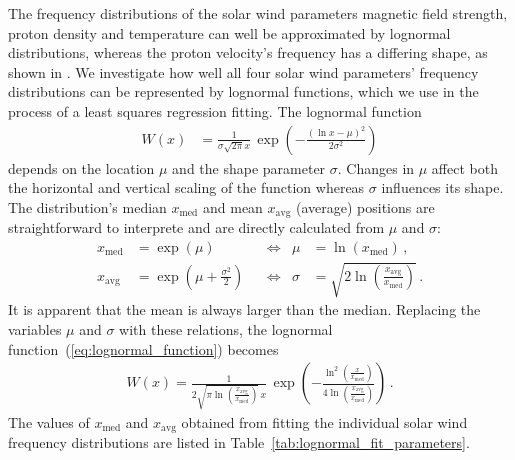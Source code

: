 The frequency distributions of the solar wind parameters magnetic field strength, proton density and temperature can
well be approximated by lognormal distributions, whereas the proton velocity’s frequency has a differing shape, as shown in \citet{Veselovsky2010}. We investigate how well all four solar wind parameters’ frequency distributions can be represented by lognormal functions, which we use in the process of a least squares regression fitting. The lognormal function 
\begin{align}
	W(x) &= \frac{1}{\sigma \sqrt{2 \pi} x} \, \exp\left(- \frac{\left(\ln x - \mu\right)^2}{2 \sigma^2}\right)	\label{eq:lognormal_function}
\end{align}
depends on the location $\mu$ and the shape parameter $\sigma$. Changes in $\mu$ affect both the horizontal and vertical scaling of the function whereas $\sigma$ influences its shape. The distribution's median $x_\text{med}$ and mean $x_\text{avg}$ (average) positions are straightforward to interprete and are directly calculated from $\mu$ and $\sigma$:
\begin{align}
	x_\text{med} &= \exp\left(\mu\right)	&	&\Longleftrightarrow	&	\mu &= \ln\left(x_\text{med}\right)\,,	\label{eq:lognormal_median}\\
	x_\text{avg} &= \exp\left(\mu + \frac{\sigma^2}{2}\right)	&	&\Longleftrightarrow	&	\sigma &= \sqrt{2 \ln\left(\frac{x_\text{avg}}{x_\text{med}}\right)}\,.	\label{eq:lognormal_mean}
\end{align}
It is apparent that the mean is always larger than the median. Replacing the variables $\mu$ and $\sigma$ with these relations, the lognormal function~(\ref{eq:lognormal_function}) becomes
\begin{align}
	W(x) = \frac{1}{2 \sqrt{\pi \ln\left(\frac{x_\text{avg}}{x_\text{med}}\right)} \, x} \, \exp\left(- \frac{\ln^2\left(\frac{x}{x_\text{med}}\right)}{4 \ln\left(\frac{x_\text{avg}}{x_\text{med}}\right)}\right)\,.	\label{eq:single_lognormal_fit_function}
\end{align}
The values of $x_\text{med}$ and $x_\text{avg}$ obtained from fitting the individual solar wind frequency distributions are listed in Table~\ref{tab:lognormal_fit_parameters}.
